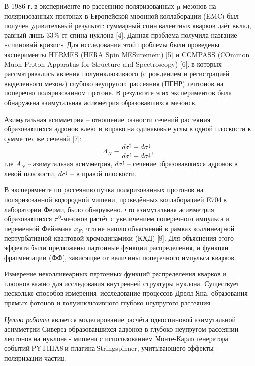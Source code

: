 \documentclass{extarticle}
\begin{document}
В 1986 г. в эксперименте по рассеянию поляризованных µ-мезонов на поляризованных протонах в Европейской-мюонной коллаборации (EMC) был получен удивительный результат: суммарный спин валентных кварков даёт вклад, равный лишь 33\% от спина нуклона [4]. Данная проблема получила название «спиновый кризис». Для исследования этой проблемы были проведены эксперименты HERMES (HERA Spin MESurement) [5] и COMPASS (COmmon Muon Proton Apparatus for Structure and Spectroscopy) [6], в которых рассматривались явления полуинклюзивного (с рождением и регистрацией выделенного мезона) глубоко неупругого рассеяния (ПГНР) лептонов на поперечно поляризованном протоне. В результате этих экспериментов была обнаружена азимутальная асимметрия образовавшихся мезонов.


Азимутальная асимметрия – отношение разности сечений рассеяния образовавшихся адронов влево и вправо на одинаковые углы в одной плоскости к сумме тех же сечений [7]:
\begin{equation}
    A_N =\frac{d\sigma^\uparrow -d\sigma^\downarrow }{d\sigma^\uparrow +d\sigma^\downarrow },
\end{equation} 
где $A_N$ -- азимутальная асимметрия, $d\sigma^\uparrow$  – сечение образовавшихся адронов в левой плоскости, $d\sigma^\downarrow$  – в правой плоскости.


 В эксперименте по рассеянию пучка поляризованных протонов на поляризованной водородной мишени, проведённых коллаборацией E704 в лаборатории Ферми, было обнаружено, что азимутальная асимметрия образовавшихся $\pi^0$-мезонов растёт с увеличением поперечного импульса и переменной Фейнмана $x_F$, что не нашло объяснений в рамках коллинеарной пертурбативной квантовой хромодинамики (КХД) [8]. Для объяснения этого эффекта были предложены партонные функции распределения, и функции фрагментации (ФФ), зависящие от величины поперечного импульса кварков.

 
 Измерение неколлинеарных партонных функций распределения кварков и глюонов важно для исследования внутренней структуры нуклона. Существует несколько способов измерения: исследование процессов Дрелл-Яна, образования прямых фотонов и полуинклюзивного глубоко неупругого рассеяния. 

\textit{Целью работы} является моделирование расчёта односпиновой азимутальной асимметрии Сиверса образовавшихся адронов в глубоко неупругом рассеянии лептонов на нуклоне - мишени с использованием Монте-Карло генератора событий PYTHIA8 и плагина Stringspinner, учитывающего эффекты поляризации частиц. 
\end{document}
